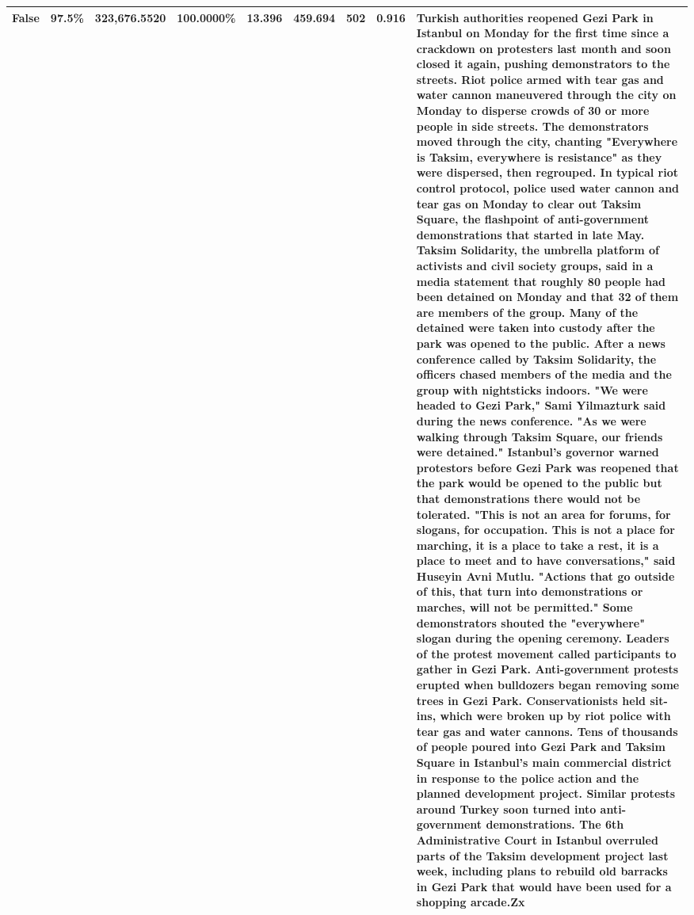 \begin{table}[H]
\begin{tabular}{lllrlllll}
\cline{1-9}
False & 97.5\% & 323,676.5520 & \bfseries \color{red} 100.0000\% & 13.396 & 459.694 & 502 & 0.916 & Turkish authorities reopened Gezi Park in Istanbul on Monday for the first time since a crackdown on protesters last month and soon closed it again, pushing demonstrators to the streets. Riot police armed with tear gas and water cannon maneuvered through the city on Monday to disperse crowds of 30 or more people in side streets. The demonstrators moved through the city, chanting "Everywhere is Taksim, everywhere is resistance" as they were dispersed, then regrouped. In typical riot control protocol, police used water cannon and tear gas on Monday to clear out Taksim Square, the flashpoint of anti-government demonstrations that started in late May. Taksim Solidarity, the umbrella platform of activists and civil society groups, said in a media statement that roughly 80 people had been detained on Monday and that 32 of them are members of the group. Many of the detained were taken into custody after the park was opened to the public. After a news conference called by Taksim Solidarity, the officers chased members of the media and the group with nightsticks indoors. "We were headed to Gezi Park," Sami Yilmazturk said during the news conference. "As we were walking through Taksim Square, our friends were detained." Istanbul's governor warned protestors before Gezi Park was reopened that the park would be opened to the public but that demonstrations there would not be tolerated. "This is not an area for forums, for slogans, for occupation. This is not a place for marching, it is a place to take a rest, it is a place to meet and to have conversations," said Huseyin Avni Mutlu. "Actions that go outside of this, that turn into demonstrations or marches, will not be permitted." Some demonstrators shouted the "everywhere" slogan during the opening ceremony. Leaders of the protest movement called participants to gather in Gezi Park. Anti-government protests erupted when bulldozers began removing some trees in Gezi Park. Conservationists held sit-ins, which were broken up by riot police with tear gas and water cannons. Tens of thousands of people poured into Gezi Park and Taksim Square in Istanbul's main commercial district in response to the police action and the planned development project. Similar protests around Turkey soon turned into anti-government demonstrations. The 6th Administrative Court in Istanbul overruled parts of the Taksim development project last week, including plans to rebuild old barracks in Gezi Park that would have been used for a shopping arcade.Zx \\
\cline{1-9}
\bottomrule
\end{tabular}
\end{table}

